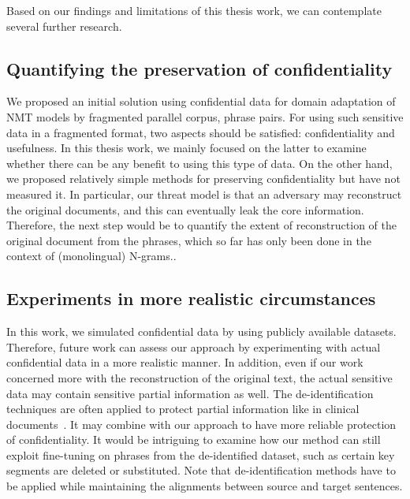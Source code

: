 Based on our findings and limitations of this thesis work, we can contemplate several further research. 

\subsection{Quantifying the preservation of confidentiality}
We proposed an initial solution using confidential data for domain adaptation of NMT models by fragmented parallel corpus, phrase pairs. For using such sensitive data in a fragmented format, two aspects should be satisfied: confidentiality and usefulness. In this thesis work, we mainly focused on the latter to examine whether there can be any benefit to using this type of data. On the other hand, we proposed relatively simple methods for preserving confidentiality but have not measured it. In particular, our threat model is that an adversary may reconstruct the original documents, and this can eventually leak the core information. Therefore, the next step would be to quantify the extent of reconstruction of the original document from the phrases, which so far has only been done in the context of (monolingual) N-grams.\parencite{galle2015reconstructing}.

\subsection{Experiments in more realistic circumstances }
In this work, we simulated confidential data by using publicly available datasets. Therefore, future work can assess our approach by experimenting with actual confidential data in a more realistic manner. In addition, even if our work concerned more with the reconstruction of the original text, the actual sensitive data may contain sensitive partial information as well. The de-identification techniques are often applied to protect partial information like in clinical documents~\parencite{meystre2010automatic}. It may combine with our approach to have more reliable protection of confidentiality. It would be intriguing to examine how our method can still exploit fine-tuning on phrases from the de-identified dataset, such as certain key segments are deleted or substituted. 
Note that de-identification methods have to be applied while maintaining the alignments between source and target sentences.

